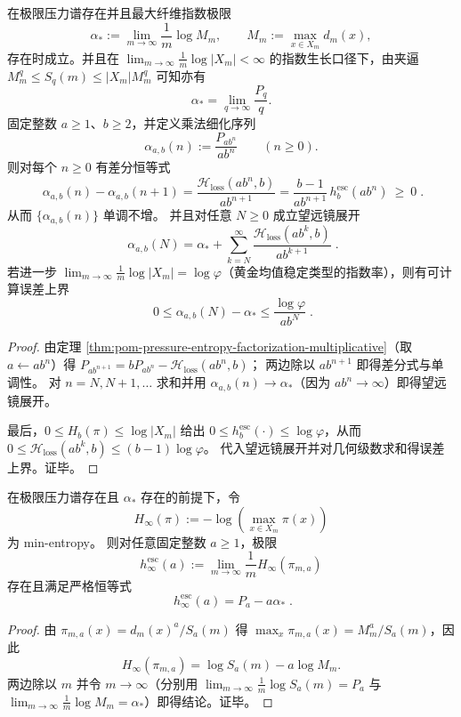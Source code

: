 \begin{theorem}\label{thm:pom-multiplicative-refinement-telescope-alpha}
在极限压力谱存在并且最大纤维指数极限
\[
\alpha_\ast:=\lim_{m\to\infty}\frac{1}{m}\log M_m,
\qquad
M_m:=\max_{x\in X_m}d_m(x),
\]
存在时成立。并且在 \(\lim_{m\to\infty}\frac{1}{m}\log|X_m|<\infty\) 的指数生长口径下，由夹逼 \(M_m^q\le S_q(m)\le |X_m|M_m^q\) 可知亦有
\[
\alpha_\ast=\lim_{q\to\infty}\frac{P_q}{q}.
\]
固定整数 \(a\ge 1\)、\(b\ge 2\)，并定义乘法细化序列
\[
\alpha_{a,b}(n):=\frac{P_{ab^n}}{ab^n}\qquad(n\ge 0).
\]
则对每个 \(n\ge 0\) 有差分恒等式
\[
\boxed{\;
\alpha_{a,b}(n)-\alpha_{a,b}(n+1)
=\frac{\mathcal{H}_{\mathrm{loss}}(ab^n,b)}{ab^{n+1}}
=\frac{b-1}{ab^{n+1}}\,h^{\mathrm{esc}}_{b}(ab^n)\ \ge\ 0\; }.
\]
从而 \(\{\alpha_{a,b}(n)\}\) 单调不增。
并且对任意 \(N\ge 0\) 成立望远镜展开
\[
\boxed{\;
\alpha_{a,b}(N)
=
\alpha_\ast+\sum_{k=N}^{\infty}\frac{\mathcal{H}_{\mathrm{loss}}(ab^k,b)}{ab^{k+1}}\; }.
\]
若进一步 \(\lim_{m\to\infty}\frac{1}{m}\log|X_m|=\log\varphi\)（黄金均值稳定类型的指数率），则有可计算误差上界
\[
\boxed{\;
0\le \alpha_{a,b}(N)-\alpha_\ast\le \frac{\log\varphi}{ab^N}\; }.
\]
\end{theorem}
\begin{proof}
由定理 \ref{thm:pom-pressure-entropy-factorization-multiplicative}（取 \(a\leftarrow ab^n\)）得
\(
P_{ab^{n+1}}=bP_{ab^n}-\mathcal{H}_{\mathrm{loss}}(ab^n,b)
\)；
两边除以 \(ab^{n+1}\) 即得差分式与单调性。
对 \(n=N,N+1,\dots\) 求和并用 \(\alpha_{a,b}(n)\to \alpha_\ast\)（因为 \(ab^n\to\infty\)）即得望远镜展开。
\par
最后，\(0\le H_b(\pi)\le \log|X_m|\) 给出
\(
0\le h^{\mathrm{esc}}_b(\cdot)\le \log\varphi
\)，从而
\(
0\le \mathcal{H}_{\mathrm{loss}}(ab^k,b)\le (b-1)\log\varphi
\)。
代入望远镜展开并对几何级数求和得误差上界。证毕。
\end{proof}

\begin{theorem}\label{thm:pom-escort-minentropy-zero-temperature-identity}
在极限压力谱存在且 \(\alpha_\ast\) 存在的前提下，令
\[
H_\infty(\pi):=-\log\!\left(\max_{x\in X_m}\pi(x)\right)
\]
为 min-entropy。
则对任意固定整数 \(a\ge 1\)，极限
\[
h_\infty^{\mathrm{esc}}(a):=\lim_{m\to\infty}\frac{1}{m}H_\infty(\pi_{m,a})
\]
存在且满足严格恒等式
\[
\boxed{\;
h_\infty^{\mathrm{esc}}(a)=P_a-a\alpha_\ast\; }.
\]
\end{theorem}
\begin{proof}
由 \(\pi_{m,a}(x)=d_m(x)^a/S_a(m)\) 得
\(
\max_x\pi_{m,a}(x)=M_m^a/S_a(m)
\)，因此
\[
H_\infty(\pi_{m,a})=\log S_a(m)-a\log M_m.
\]
两边除以 \(m\) 并令 \(m\to\infty\)（分别用 \(\lim_{m\to\infty}\frac{1}{m}\log S_a(m)=P_a\) 与 \(\lim_{m\to\infty}\frac{1}{m}\log M_m=\alpha_\ast\)）即得结论。证毕。
\end{proof}

